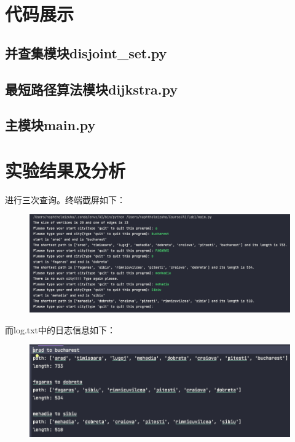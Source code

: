 \documentclass[UTF8]{ctexart}
\begin{document}
    \DecMargin{1em}
    \section{代码展示}
    \subsection{并查集模块disjoint\_set.py}
    \subsection{最短路径算法模块dijkstra.py}
    \subsection{主模块main.py}

    \section{实验结果及分析}
    进行三次查询。终端截屏如下：
    \begin{figure}[htbp]\label{fig:figure}
        \includegraphics[scale=0.3]{res}
    \end{figure}
    \newpage
    而log.txt中的日志信息如下：
    \begin{figure}[htbp]\label{fig:figure2}
        \includegraphics[scale=0.4]{log}
    \end{figure}
\end{document}
